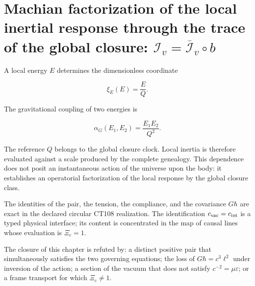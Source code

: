 \section{Machian factorization of the local inertial response through the trace of the global closure: \(\mathcal I_v=\overline{\mathcal I}_v\circ b\)}

A local energy \(E\) determines the dimensionless coordinate

\[
\xi_E(E)=\frac{E}{Q}.
\]

The gravitational coupling of two energies is

\begin{equation}
\alpha_G(E_1,E_2)=\frac{E_1E_2}{Q^2}.
\label{eq:rm-mach-coupling}
\end{equation}

The reference \(Q\) belongs to the global closure clock. Local inertia is therefore evaluated against a scale produced by the complete genealogy. This dependence does not posit an instantaneous action of the universe upon the body: it establishes an operatorial factorization of the local response by the global closure class.

\begin{proofstatusbox}
The identities of the pair, the tension, the compliance, and the covariance
\(G\hbar\) are exact in the declared circular CT108 realization. The
identification \(c_{\rm vac}=c_{\rm int}\) is a typed physical interface;
its content is concentrated in the map of causal lines whose evaluation is
\(\Xi_c=1\).
\end{proofstatusbox}

\begin{falsifierbox}
The closure of this chapter is refuted by: a distinct positive pair that simultaneously satisfies the two governing equations; the loss of \(G\hbar=c^3\ell^2\) under inversion of the action; a section of the vacuum that does not satisfy \(c^{-2}=\mu\varepsilon\); or a frame transport for which \(\Xi_c\ne1\).
\end{falsifierbox}
